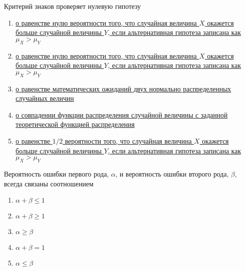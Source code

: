 \documentclass[t]{beamer}
\begin{document}
 \begin{frame} \label{57} 
\begin{block}{57} 

Критерий знаков проверяет нулевую гипотезу
 


 \end{block} 
\begin{enumerate} 
\item[] \hyperlink{57-Yes}{\beamergotobutton{} о равенстве нулю вероятности того, что случайная величина $X$ окажется больше случайной величины $Y$, если альтернативная гипотеза записана как $\mu_X>\mu_Y$}
\item[] \hyperlink{57-No}{\beamergotobutton{} о равенстве нулю вероятности того, что случайная величина $X$ окажется больше случайной величины $Y$, если альтернативная гипотеза записана как $\mu_X>\mu_Y$ }
\item[] \hyperlink{57-No}{\beamergotobutton{} о равенстве математических ожиданий двух нормально распределенных случайных величин}
\item[] \hyperlink{57-No}{\beamergotobutton{} о совпадении функции распределения случайной величины с заданной теоретической функцией распределения}
\item[] \hyperlink{57-No}{\beamergotobutton{} о равенстве $1/2$ вероятности того, что случайная величина $X$ окажется больше случайной величины $Y$, если альтернативная гипотеза записана как $\mu_X>\mu_Y$}
\end{enumerate} 
\end{frame} 


 \begin{frame} \label{58} 
\begin{block}{58} 

Вероятность ошибки первого рода, $\alpha$, и вероятность ошибки второго рода, $\beta$, всегда связаны соотношением


 \end{block} 
\begin{enumerate} 
\item[] \hyperlink{58-No}{\beamergotobutton{} $\alpha+\beta \leq 1$}
\item[] \hyperlink{58-No}{\beamergotobutton{} $\alpha+\beta \geq 1$}
\item[] \hyperlink{58-No}{\beamergotobutton{} $\alpha\geq \beta $}
\item[] \hyperlink{58-No}{\beamergotobutton{} $\alpha+\beta=1$}
\item[] \hyperlink{58-No}{\beamergotobutton{} $\alpha\leq \beta $}
\end{enumerate} 
\end{frame} 
\end{document}
